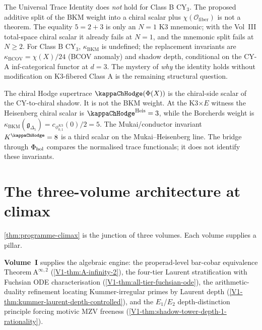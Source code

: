 \begin{remark}
The Universal Trace Identity does \emph{not} hold for Class B
CY$_{3}$. The proposed additive split of the BKM weight into a chiral
scalar plus $\chi(\mathcal{O}_{\mathrm{fiber}})$ is not a theorem.
The equality $5=2+3$ is only an $N=1$ K3 mnemonic; with the Vol~III
total-space chiral scalar it already fails at $N=1$, and the mnemonic
split fails at $N \ge 2$.
For Class B CY$_{3}$, $\kappa_{\mathrm{BKM}}$ is undefined; the
replacement invariants are $\kappa_{\mathrm{BCOV}} = \chi(X)/24$
(BCOV anomaly) and shadow depth, conditional on the CY-A
inf-categorical functor at $d = 3$. The mystery of \emph{why} the
identity holds without modification on K3-fibered Class A is the
remaining structural question.
\end{remark}

\begin{remark}
The chiral Hodge supertrace $\kappaChHodge(\Phi(X))$ is the
chiral-side scalar of the CY-to-chiral shadow. It is not the BKM
weight. At the K3$\times E$ witness the Heisenberg chiral scalar is
${\kappaChHodge}^{\mathrm{Heis}}=3$, while the Borcherds weight
is $\kappa_{\mathrm{BKM}}(\mathfrak g_{\Delta_5})
=c_{\phi_{0,1}^{K3}}(0)/2=5$. The Mukai/conductor invariant
$K^{\kappaChHodge}=8$ is a third scalar on the
Mukai--Heisenberg line. The bridge through $\Phi_{\mathrm{hol}}$ compares the
normalised trace functionals; it does not identify these invariants.
\end{remark}

\section{The three-volume architecture at climax}
\label{sec:climax-architecture}

\cref{thm:programme-climax} is the junction of three volumes. Each
volume supplies a pillar.

\textbf{Volume~I} supplies the algebraic engine: the properad-level
bar-cobar equivalence $\mathrm{Theorem~A}^{\infty,2}$
(\cref{V1-thm:A-infinity-2}), the four-tier Laurent stratification with
Fuchsian ODE characterisation
(\cref{V1-thm:all-tier-fuchsian-ode}), the arithmetic-duality
refinement locating Kummer-irregular primes by Laurent depth
(\cref{V1-thm:kummer-laurent-depth-controlled}), and the $E_{1}$/$E_{2}$
depth-distinction principle forcing motivic MZV freeness
(\cref{V1-thm:shadow-tower-depth-1-rationality}).

